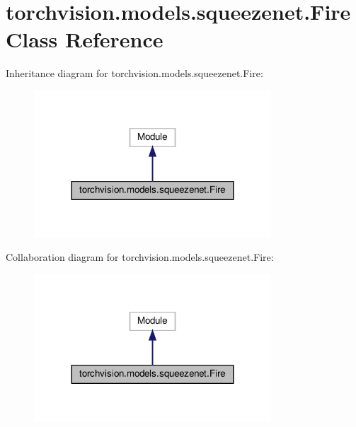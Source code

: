 \hypertarget{classtorchvision_1_1models_1_1squeezenet_1_1Fire}{}\section{torchvision.\+models.\+squeezenet.\+Fire Class Reference}
\label{classtorchvision_1_1models_1_1squeezenet_1_1Fire}


Inheritance diagram for torchvision.\+models.\+squeezenet.\+Fire\+:
\nopagebreak
\begin{figure}[H]
\begin{center}
\leavevmode
\includegraphics[width=251pt]{classtorchvision_1_1models_1_1squeezenet_1_1Fire__inherit__graph}
\end{center}
\end{figure}


Collaboration diagram for torchvision.\+models.\+squeezenet.\+Fire\+:
\nopagebreak
\begin{figure}[H]
\begin{center}
\leavevmode
\includegraphics[width=251pt]{classtorchvision_1_1models_1_1squeezenet_1_1Fire__coll__graph}
\end{center}
\end{figure}
